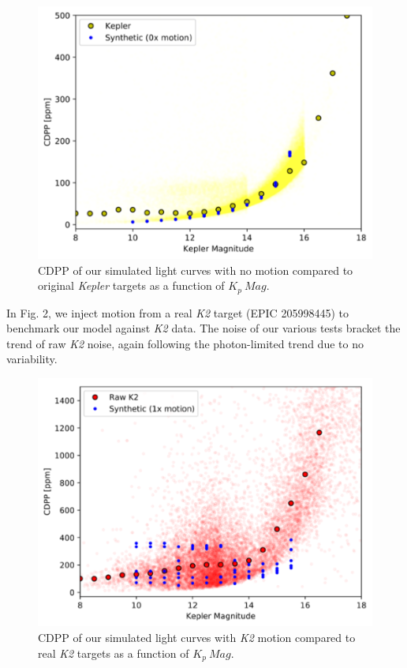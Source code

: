 \documentclass[12pt,preprint]{aastex}
\begin{document}
\begin{figure}[h]
	\centering
	\includegraphics[width=1.0\linewidth]{nomotion.png}
	\caption{CDPP of our simulated light curves with no motion compared to original \textit{Kepler} targets as a function of $K_p\ Mag$.}
	\label{fig:nomotion}
\end{figure}

In Fig. 2, we inject motion from a real \textit{K2} target (EPIC 205998445) to benchmark our model against \textit{K2} data. The noise of our various tests bracket the trend of raw \textit{K2} noise, again following the photon-limited trend due to no variability.

\begin{figure}[h]
	\centering
	\includegraphics[width=1.0\linewidth]{1xmotion.png}
	\caption{CDPP of our simulated light curves with \textit{K2} motion compared to real \textit{K2} targets as a function of $K_p\ Mag$.}
	\label{fig:1motion}
\end{figure}
\end{document}
